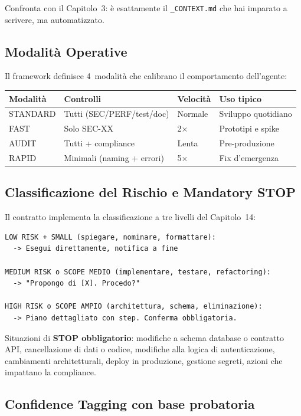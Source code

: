 Confronta con il Capitolo~3: è esattamente il \texttt{\_CONTEXT.md} che hai imparato a scrivere, ma automatizzato.

\subsection{Modalità Operative}

Il framework definisce 4~modalità che calibrano il comportamento dell'agente:

\begin{center}
\begin{tabularx}{\textwidth}{l l l X}
\toprule
\textbf{Modalità} & \textbf{Controlli} & \textbf{Velocità} & \textbf{Uso tipico} \\
\midrule
STANDARD & Tutti (SEC/PERF/test/doc) & Normale & Sviluppo quotidiano \\
FAST & Solo SEC-XX & 2$\times$ & Prototipi e spike \\
AUDIT & Tutti + compliance & Lenta & Pre-produzione \\
RAPID & Minimali (naming + errori) & 5$\times$ & Fix d'emergenza \\
\bottomrule
\end{tabularx}
\end{center}

\subsection{Classificazione del Rischio e Mandatory STOP}

Il contratto implementa la classificazione a tre livelli del Capitolo~14:

\begin{lstlisting}[language={}]
LOW RISK + SMALL (spiegare, nominare, formattare):
  -> Esegui direttamente, notifica a fine

MEDIUM RISK o SCOPE MEDIO (implementare, testare, refactoring):
  -> "Propongo di [X]. Procedo?"

HIGH RISK o SCOPE AMPIO (architettura, schema, eliminazione):
  -> Piano dettagliato con step. Conferma obbligatoria.
\end{lstlisting}

Situazioni di \textbf{STOP obbligatorio}: modifiche a schema database o contratto API, cancellazione di dati o codice, modifiche alla logica di autenticazione, cambiamenti architetturali, deploy in produzione, gestione segreti, azioni che impattano la compliance.

\subsection{Confidence Tagging con base probatoria}

